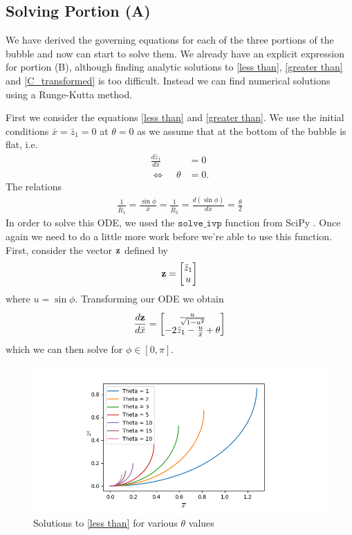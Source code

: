\subsection{Solving Portion (A)}

We have derived the governing equations for each of the three portions of the bubble and now can start to solve them. We already have an explicit expression for portion (B), although finding analytic solutions to \ref{less than}, \ref{greater than} and \ref{C_transformed} is too difficult. Instead we can find numerical solutions using a Runge-Kutta method.

First we consider the equations \ref{less than} and \ref{greater than}. We use the initial conditions $\bar{x}=\bar{z}_1=0$ at $\theta=0$ as we assume that at the bottom of the bubble is flat, i.e.
\begin{align}
    \frac{d\bar{z}_1}{d\bar{x}}&=0\\
    \Leftrightarrow \:\:\:\:\:\theta&=0.
\end{align}
The relations
\begin{align}
    \frac{1}{\bar{R}_1}=\frac{\sin\phi}{\bar{x}}=\frac{1}{\bar{R}_2}=\frac{d(\sin\phi)}{d\bar{x}}=\frac{\theta}{2}
\end{align}
In order to solve this ODE, we used the $\texttt{solve\_ivp}$ function from SciPy \cite{2020SciPy-NMeth}. Once again we need to do a little more work before we're able to use this function. First, consider the vector $\bf{z}$ defined by
\begin{align}
    \bf{z} = \begin{bmatrix}
           \bar{z}_1 \\
           u \\
         \end{bmatrix}
\end{align}
where $u=\sin \phi$. Transforming our ODE we obtain
\begin{align}
    \frac{d\bf{z}}{d\bar{x}}=\begin{bmatrix}
           \frac{u}{\sqrt{1-u^2}} \\
           -2\bar{z}_1 - \frac{u}{\bar{x}}+\theta \\
         \end{bmatrix}
\end{align}
which we can then solve for $\phi \in [0,\pi]$.
\begin{figure}[hb]
    \centering
    \includegraphics[width=0.85\linewidth]{WriteUp/images/bottom curve.png}
    \caption{Solutions to \ref{less than} for various $\theta$ values}
    \label{fig:5}
\end{figure}
